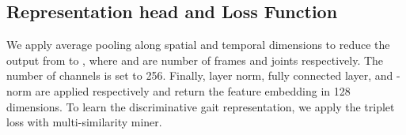 \documentclass{article}
\begin{document}
\subsection{Representation head and Loss Function} 
We apply average pooling along spatial and temporal dimensions to reduce the output from  to , where  and  are number of frames and joints respectively. The number of channels  is set to 256. Finally, layer norm, fully connected layer, and -norm are applied respectively and return the feature embedding in 128 dimensions. To learn the discriminative gait representation, we apply the triplet loss with multi-similarity miner.
\end{document}
